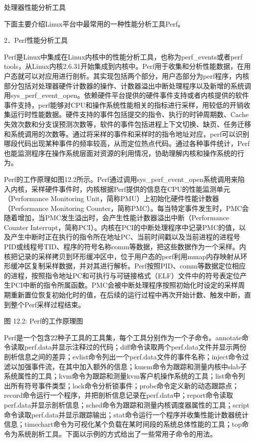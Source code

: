 \documentclass[]{ctexbook}
\begin{document}
\label{tab:perf-tools}处理器性能分析工具

下面主要介绍Linux平台中最常用的一种性能分析工具Perf。

2．Perf性能分析工具

Perf是Linux中集成在Linux内核中的性能分析工具，也称为perf\_events或者perf tools，从Linux内核2.6.31开始集成到内核中。Perf用于收集和分析性能数据，在用户态就可以对应用进行剖析。其实现包括两个部分，用户态部分为perf程序，内核部分包括对处理器硬件计数器的操作、计数器溢出中断处理程序以及新增的系统调用sys\_perf\_event\_open。依赖硬件平台提供的硬件事件支持或者内核提供的软件事件支持，perf能够对CPU和操作系统性能相关的指标进行采样，用较低的开销收集运行时性能数据。硬件支持的事件包括提交的指令、执行的时钟周期数、Cache失效次数和分支误预测次数等，软件的事件包括进程上下文切换、缺页、任务迁移和系统调用的次数等。通过将采样的事件和采样时的指令地址对应，perf可以识别哪段代码出现某种事件的频率较高，从而定位热点代码。通过各种事件统计，Perf也能监测程序在操作系统层面对资源的利用情况，协助理解内核和操作系统的行为。

Perf的工作原理如图12.2所示。Perf通过调用sys\_perf\_event\_open系统调用来陷入内核，采样硬件事件时，内核根据Perf提供的信息在CPU的性能监测单元（Performance Monitoring Unit，简称PMU）上初始化硬件性能计数器（Performance Monitoring Counter，简称PMC）。每当特定事件发生时，PMC会随着增加，当PMC发生溢出时，会产生性能计数器溢出中断（Performance Counter Interrupt，简称PCI）。内核在PCI的中断处理程序中记录PMC的值，以及产生中断时正在执行的指令所在地址PC、当前时间戳以及当前进程的进程号PID或线程号TID、程序的符号名称comm等数据，把这些数据作为一个采样。内核把记录的采样拷贝到环形缓冲区中，位于用户态的perf利用mmap内存映射从环形缓冲区复制采样数据，并对其进行解析。Perf按照PID、comm等数据定位相应的进程，按照指令地址PC和可执行与可链接格式（ELF）文件中的符号表定位产生PCI中断的指令所属函数。PMC会被中断处理程序按照初始化时设定的采样周期重新置位恢复初始化时的值，在后续的运行过程中再次开始计数、触发中断，直到整个Perf采样过程结束。

图 12.2: Perf的工作原理图

Perf是一个包含22种子工具的工具集，每个工具分别作为一个子命令。annotate命令读取perf.data并显示注释过的代码；diff命令读取两个perf.data文件并显示两份剖析信息之间的差异；evlist命令列出一个perf.data文件的事件名称；inject命令过滤以加强事件流，在其中加入额外的信息；kmem命令为跟踪和测量内核中slab子系统属性的工具；kvm命令为跟踪和测量kvm客户机操作系统的工具；list命令列出所有符号事件类型；lock命令分析锁事件；probe命令定义新的动态跟踪点；record命令运行一个程序，并把剖析信息记录在perf.data中；report命令读取perf.data并显示剖析信息；sched命令为跟踪和测量内核调度器属性的工具；script命令读取perf.data并显示跟踪输出；stat命令运行一个程序并收集性能计数器统计信息；timechart命令为可视化某个负载在某时间段的系统总体性能的工具；top命令为系统剖析工具。下面以示例的方式给出了一些常用子命令的用法。
\end{document}
